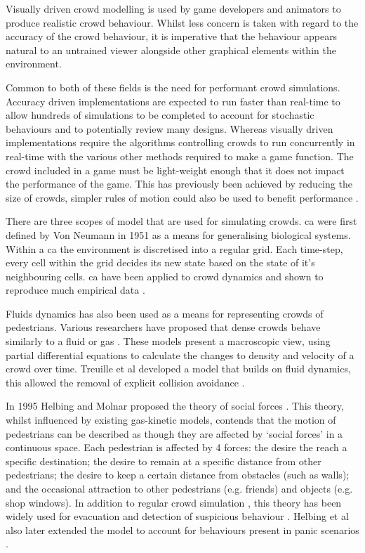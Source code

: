     Visually driven crowd modelling is used by game developers and animators to produce realistic crowd behaviour. Whilst less concern is taken with regard to the accuracy of the crowd behaviour, it is imperative that the behaviour appears natural to an untrained viewer alongside other graphical elements within the environment.

    Common to both of these fields is the need for performant crowd simulations. Accuracy driven implementations are expected to run faster than real-time to allow hundreds of simulations to be completed to account for stochastic behaviours and to potentially review many designs. Whereas visually driven implementations require the algorithms controlling crowds to run concurrently in real-time with the various other methods required to make a game function. The crowd included in a game must be light-weight enough that it does not impact the performance of the game. This has previously been achieved by reducing the size of crowds, simpler rules of motion could also be used to benefit performance \cite{Fau12}.
    
    There are three scopes of model that are used for simulating crowds. \gls{ca} were first defined by Von Neumann in 1951 \cite{Neu51} as a means for generalising biological systems. Within a \gls{ca} the environment is discretised into a regular grid. Each time-step, every cell within the grid decides its new state based on the state of it's neighbouring cells. \gls{ca} have been applied to crowd dynamics and shown to reproduce much empirical data \cite{PT*02,ZZL09}.
    
    Fluids dynamics has also been used as a means for representing crowds of pedestrians. Various researchers have proposed that dense crowds behave similarly to a fluid or gas \cite{Hen71,Bra93}. These models present a macroscopic view, using partial differential equations to calculate the changes to density and velocity of a crowd over time. Treuille et al developed a model that builds on fluid dynamics, this allowed the removal of explicit collision avoidance \cite{TCP06}.
    
    In 1995 Helbing and Molnar proposed the theory of social forces \cite{HM95}. This theory, whilst influenced by existing gas-kinetic models, contends that the motion of pedestrians can be described as though they are affected by `social forces' in a continuous space. Each pedestrian is affected by 4 forces: the desire the reach a specific destination; the desire to remain at a specific distance from other pedestrians; the desire to keep a certain distance from obstacles (such as walls); and the occasional attraction to other pedestrians (e.g. friends) and objects (e.g. shop windows). In addition to regular crowd simulation \cite{ST05}, this theory has been widely used for evacuation \cite{GH08} and detection of suspicious behaviour \cite{MOS09}. Helbing et al also later extended the model to account for behaviours present in panic scenarios \cite{HFV00}.
    
